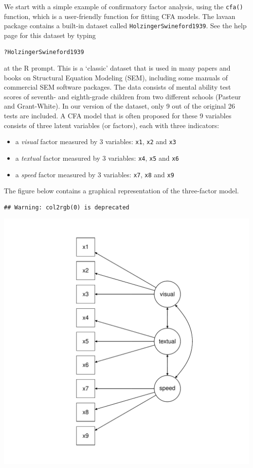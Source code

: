 We start with a simple example of confirmatory factor analysis, using
the \texttt{cfa()} function, which is a user-friendly function for
fitting CFA models. The lavaan package contains a built-in dataset
called \texttt{HolzingerSwineford1939}. See the help page for this
dataset by typing

\begin{verbatim}
?HolzingerSwineford1939
\end{verbatim}

at the R prompt. This is a `classic' dataset that is used in many papers
and books on Structural Equation Modeling (SEM), including some manuals
of commercial SEM software packages. The data consists of mental ability
test scores of seventh- and eighth-grade children from two different
schools (Pasteur and Grant-White). In our version of the dataset, only 9
out of the original 26 tests are included. A CFA model that is often
proposed for these 9 variables consists of three latent variables (or
factors), each with three indicators:

\begin{itemize}
\itemsep1pt\parskip0pt
\item
  a \emph{visual} factor measured by 3 variables: \texttt{x1},
  \texttt{x2} and \texttt{x3}
\item
  a \emph{textual} factor measured by 3 variables: \texttt{x4},
  \texttt{x5} and \texttt{x6}
\item
  a \emph{speed} factor measured by 3 variables: \texttt{x7},
  \texttt{x8} and \texttt{x9}
\end{itemize}

The figure below contains a graphical representation of the three-factor
model.

\begin{verbatim}
## Warning: col2rgb(0) is deprecated
\end{verbatim}

\includegraphics{figure/cfa.pdf}

